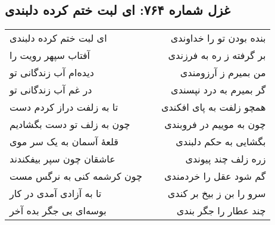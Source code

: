 \begin{center}
\section*{غزل شماره ۷۶۴: ای لبت ختم کرده دلبندی}
\label{sec:764}
\begin{longtable}{l p{0.5cm} r}
ای لبت ختم کرده دلبندی
&&
بنده بودن تو را خداوندی
\\
آفتاب سپهر رویت را
&&
بر گرفته ز ره به فرزندی
\\
دیده‌ام آب زندگانی تو
&&
من بمیرم ز آرزومندی
\\
در غم آب زندگانی تو
&&
گر بمیرم به درد نپسندی
\\
تا به زلفت دراز کردم دست
&&
همچو زلفت به پای افکندی
\\
چون به زلف تو دست بگشادیم
&&
چون به موییم در فروبندی
\\
قلعهٔ آسمان به یک سر موی
&&
بگشایی به حکم دلبندی
\\
عاشقان چون سپر بیفکندند
&&
زره زلف چند پیوندی
\\
چون کرشمه کنی به نرگس مست
&&
گم شود عقل را خردمندی
\\
تا به آزادی آمدی در کار
&&
سرو را بن ز بیخ بر کندی
\\
بوسه‌ای بی جگر بده آخر
&&
چند عطار را جگر بندی
\\
\end{longtable}
\end{center}
